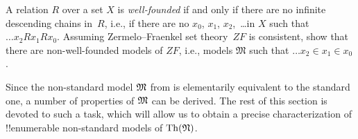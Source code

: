 \documentclass[../../../include/open-logic-section]{subfiles}
\begin{document}
\begin{prob}
A relation $R$ over a set $X$ is \emph{well-founded} if and only if
there are no infinite descending chains in~$R$, i.e., if there are no
$x_0$, $x_1$, $x_2$,~\dots in $X$ such that $\dots x_2Rx_1Rx_0$.  Assuming
Zermelo--Fraenkel set theory~$ZF$ is consistent, show that there are
non-well-founded models of $ZF$, i.e., models $\mathfrak{M}$ such that
$\dots x_2 \in x_1 \in x_0$.
\end{prob}

Since the non-standard model $\Struct{M}$ from  is
elementarily equivalent to the standard one, a number of properties of
$\Struct{M}$ can be derived. The rest of this section is devoted to
such a task, which will allow us to obtain a precise characterization
of !!{enumerable} non-standard models of $\Theory{N}$.
\end{document}
